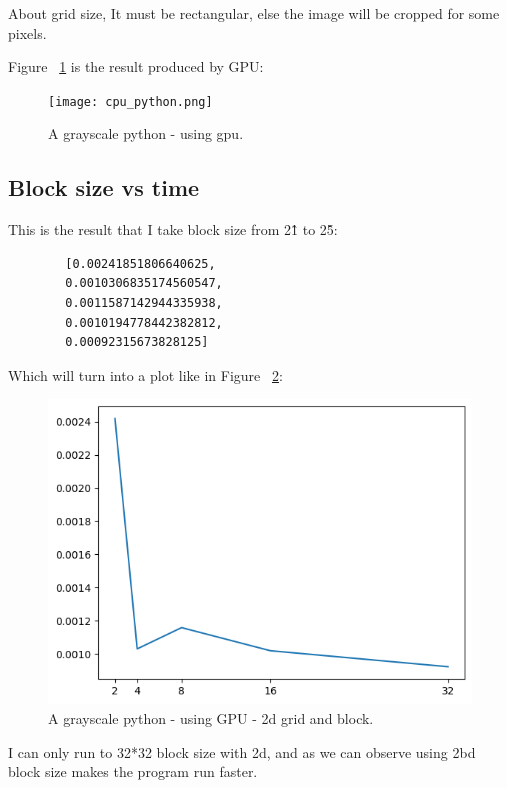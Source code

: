 \documentclass{article}
\begin{document}
	About grid size, It must be rectangular, else the image will be cropped for some pixels.
	
	Figure ~\ref{fig:cpu_python} is the result produced by GPU:
	
	\begin{figure}
		\texttt{[image: cpu\_python.png]}
		\caption{A grayscale python - using gpu.}
		\label{fig:cpu_python}
	\end{figure}
	
	\subsection{Block size vs time}
	This is the result that I take block size from 2\^1 to 2\^5:
	\begin{verbatim}
		[0.00241851806640625,
		0.0010306835174560547,
		0.0011587142944335938,
		0.0010194778442382812,
		0.00092315673828125]
	\end{verbatim}
	Which will turn into a plot like in Figure ~\ref{fig:plot_2d}:
	\begin{figure}
		\includegraphics[width=\linewidth]{plot_2d.png}
		\caption{A grayscale python - using GPU - 2d grid and block.}
		\label{fig:plot_2d}
	\end{figure}
	
	I can only run to 32*32 block size with 2d, and as we can observe using 2bd block size makes the program run faster.
	
\end{document}
